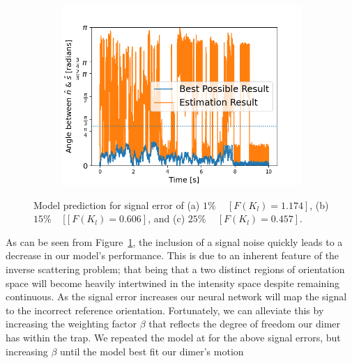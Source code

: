\documentclass[final,  3p]{elsarticle}
\begin{document}
\begin{figure}[h]
\begin{subfigure}{0.32\textwidth}
		\includegraphics[width=\textwidth]{./Images/fig6c.png}
	\end{subfigure}
	\caption{Model prediction for signal error of (a) $1\%$ ~  $[F(K_l)=1.174]$, (b) $15\%$ ~ [$[F(K_l)=0.606]$, and (c) $25\%$ ~  $[F(K_l)=0.457]$.}
	\label{fig:epsilon}
\end{figure}

As can be seen from Figure~\ref{fig:epsilon}, the inclusion of a signal noise quickly leads to a decrease in our model's performance. This is due to an inherent feature of the inverse scattering problem; that being that a two distinct regions of orientation space will become heavily intertwined in the intensity space despite remaining continuous. As the signal error increases our neural network will map the signal to the incorrect reference orientation.
%
Fortunately, we can alleviate this by increasing the weighting factor $\beta$ that reflects the degree of freedom our dimer has within the trap. We repeated the model at for the above signal errors, but increasing $\beta$ until the model best fit our dimer's motion 
\end{document}
